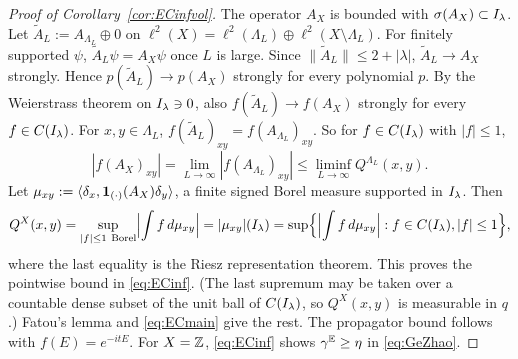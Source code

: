 \begin{proof}[Proof of Corollary~\ref{cor:ECinfvol}]
The operator $A_X$ is bounded with $\sigma(A_X)\subset I_\lambda$.  Let $\tilde A_L:=A_{\Lambda_L}\oplus0$ on
$\ell^2(X)=\ell^2(\Lambda_L)\oplus\ell^2(X\setminus\Lambda_L)$.  For finitely supported $\psi$,
$\tilde A_L\psi=A_X\psi$ once $L$ is large.  Since $\|\tilde A_L\|\le2+|\lambda|$, $\tilde A_L\to A_X$ strongly.
Hence $p(\tilde A_L)\to p(A_X)$ strongly for every polynomial $p$.  By the Weierstrass theorem on
$I_\lambda\ni0$, also $f(\tilde A_L)\to f(A_X)$ strongly for every $f\in C(I_\lambda)$.  For $x,y\in\Lambda_L$,
$f(\tilde A_L)_{xy}=f(A_{\Lambda_L})_{xy}$.  So for $f\in C(I_\lambda)$ with $|f|\le1$,
\[
  |f(A_X)_{xy}|=\lim_{L\to\infty}|f(A_{\Lambda_L})_{xy}|\le\liminf_{L\to\infty}Q^{\Lambda_L}(x,y).
\]
Let $\mu_{xy}:=\langle\delta_x,\mathbf{1}_{(\cdot)}(A_X)\delta_y\rangle$, a finite signed Borel measure supported in
$I_\lambda$.  Then
\[
  Q^X(x,y)=\sup_{|f|\le1\ \rm Borel}\Bigl|\int f\,d\mu_{xy}\Bigr|=|\mu_{xy}|(I_\lambda)
  =\sup\Bigl\{\Bigl|\int f\,d\mu_{xy}\Bigr|:f\in C(I_\lambda),|f|\le1\Bigr\},
\]
where the last equality is the Riesz representation theorem.  This proves the
pointwise bound in \eqref{eq:ECinf}.  (The last supremum may be taken over a countable dense subset of
the unit ball of $C(I_\lambda)$, so $Q^X(x,y)$ is measurable in $q$.)  Fatou's lemma and \eqref{eq:ECmain} give the rest.  The propagator
bound follows with $f(E)=e^{-itE}$.  For $X=\mathbb{Z}$, \eqref{eq:ECinf} shows $\gamma^{\mathbb{E}}\ge\eta$ in
\eqref{eq:GeZhao}.
\end{proof}


